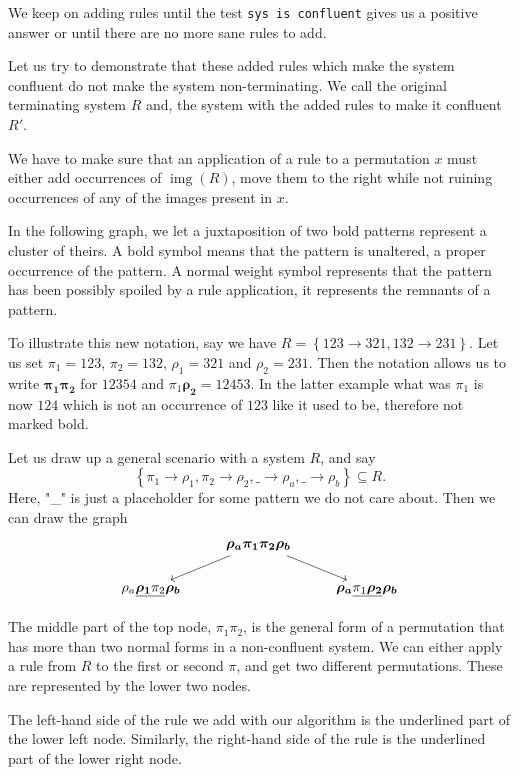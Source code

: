 \documentclass[a4paper, 11pt, english]{article}
\newcommand{\patternrule}{ \to \!}
\theoremstyle{definition}
\DeclareMathOperator{\img}{img}
\begin{document}
We keep on adding rules until the test \verb|sys is confluent| gives us a positive answer
or until there are no more sane rules to add.

Let us try to demonstrate that these added rules which make the system confluent do
not make the system non-terminating.
We call the original terminating system $R$ and, the system with the added rules to make it confluent
$R'$.
 
We have to make sure that an application of a rule to a permutation $x$ must either add occurrences of $\img(R)$, move them
to the right while not ruining occurrences of any of the images present in $x$.

In the following graph, we let a juxtaposition of two bold patterns represent a cluster of theirs. A bold
symbol means that the pattern is unaltered, a proper occurrence of the pattern. A normal weight
symbol represents that the pattern has been possibly spoiled by a rule application, it represents the
remnants of a pattern.

To illustrate this new notation, say we have $R = \left\{ 123 \patternrule 321, 132 \patternrule 231
\right\}$. Let us set $\pi_1 = 123$, $\pi_2 = 132$, $\rho_1 = 321$ and $\rho_2 = 231$.
Then the notation allows us to write $\bm{\pi_1 \pi_2}$ for $12354$ and $\pi_1 \bm{\rho_2} =
12453$. In the latter example what was $\pi_1$ is now $124$ which is not an occurrence of $123$ like
it used to be, therefore not marked bold.

Let us draw up a general scenario with a system $R$, and say 
\[
  \left\{ \pi_1 \patternrule \rho_1, \pi_2 \patternrule \rho_2, 
  \_ \patternrule \rho_a, \_ \patternrule \rho_b \right\} \subseteq R.
\]
Here, "\_" is just a placeholder for some pattern we do not care about. Then we can draw the graph
\[
\begin{tikzcd}  
    & \bm{\rho_a \pi_1 \pi_2 \rho_b} \arrow[dl] \arrow[dr] & \\
    \rho_a \underline{\bm{\rho_1}\pi_2}\bm{\rho_b} & & \bm{\rho_a}\underline{\pi_1 \bm{\rho_2}} \bm{\rho_b}
\end{tikzcd}
\]

The middle part of the top node, $\pi_1\pi_2$, is the general form of a permutation that has more than two normal forms in
a non-confluent system. We can either apply a rule from $R$ to the first or second $\pi$, and get two different
permutations. These are represented by the lower two nodes.

The left-hand side of the rule we add with our algorithm is the underlined part of the lower left
node. Similarly, the right-hand side of the rule is the underlined part of the lower right node.
\end{document}
